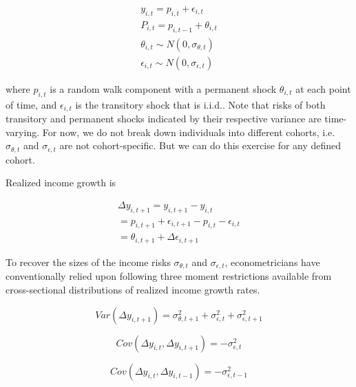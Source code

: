 \documentclass[12pt,notitlepage,onecolumn,aps,pra]{article}
\begin{document}
\begin{equation}
\begin{split}
y_{i,t} = p_{i,t} + \epsilon_{i,t} \\
P_{i,t} = p_{i,t-1} + \theta_{i,t} \\
\theta_{i,t} \sim N(0,\sigma_{\theta,t}) \\
\epsilon_{i,t} \sim N(0,\sigma_{\epsilon,t})
\end{split}
\end{equation}

where \(p_{i,t}\) is a random walk component with a permanent shock
\(\theta_{i,t}\) at each point of time, and \(\epsilon_{i,t}\) is the
transitory shock that is i.i.d.. Note that risks of both transitory and
permanent shocks indicated by their respective variance are
time-varying. For now, we do not break down individuals into different
cohorts, i.e. \(\sigma_{\theta,t}\) and \(\sigma_{\epsilon,t}\) are not
cohort-specific. But we can do this exercise for any defined cohort.

Realized income growth is

\begin{equation}
\begin{split}
\Delta y_{i,t+1} = y_{i,t+1} - y_{i,t} \\
 = p_{i,t+1} + \epsilon_{i,t+1} - p_{i,t} - \epsilon_{i,t} \\
 = \theta_{i,t+1} + \Delta \epsilon_{i,t+1}
\end{split}
\end{equation}

To recover the sizes of the income risks \(\sigma_{\theta,t}\) and
\(\sigma_{\epsilon,t}\), econometricians have conventionally relied upon
following three moment restrictions available from cross-sectional
distributions of realized income growth rates.

\begin{equation}
\label{VarUC}
Var (\Delta y_{i,t+1}) =  \sigma^2_{\theta,t+1} +\sigma^2_{\epsilon,t}+ \sigma^2_{\epsilon,t+1}
\end{equation}

\begin{equation}
\label{AvarUC1}
Cov (\Delta y_{i,t}, \Delta y_{i,t+1}) =  - \sigma^2_{\epsilon,t}
\end{equation}

\begin{equation}
\label{AvarUC2}
Cov (\Delta y_{i,t}, \Delta y_{i,t-1}) =  - \sigma^2_{\epsilon,t-1}
\end{equation}
\end{document}
